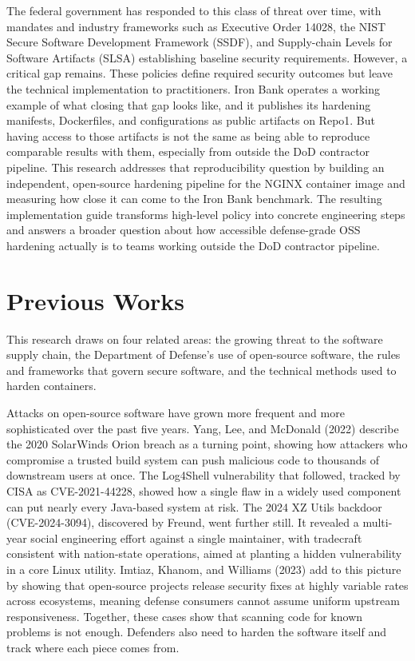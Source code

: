 \documentclass[10pt,letterpaper,twocolumn]{article}
\begin{document}
The federal government has responded to this class of threat over time, with mandates and industry frameworks such as Executive Order 14028, the NIST Secure Software Development Framework (SSDF), and Supply-chain Levels for Software Artifacts (SLSA) establishing baseline security requirements. However, a critical gap remains. These policies define required security outcomes but leave the technical implementation to practitioners. Iron Bank operates a working example of what closing that gap looks like, and it publishes its hardening manifests, Dockerfiles, and configurations as public artifacts on Repo1. But having access to those artifacts is not the same as being able to reproduce comparable results with them, especially from outside the DoD contractor pipeline. This research addresses that reproducibility question by building an independent, open-source hardening pipeline for the NGINX container image and measuring how close it can come to the Iron Bank benchmark. The resulting implementation guide transforms high-level policy into concrete engineering steps and answers a broader question about how accessible defense-grade OSS hardening actually is to teams working outside the DoD contractor pipeline.

\section{Previous Works}

This research draws on four related areas: the growing threat to the software supply chain, the Department of Defense's use of open-source software, the rules and frameworks that govern secure software, and the technical methods used to harden containers.

Attacks on open-source software have grown more frequent and more sophisticated over the past five years. Yang, Lee, and McDonald (2022) describe the 2020 SolarWinds Orion breach as a turning point, showing how attackers who compromise a trusted build system can push malicious code to thousands of downstream users at once. The Log4Shell vulnerability that followed, tracked by CISA as CVE-2021-44228, showed how a single flaw in a widely used component can put nearly every Java-based system at risk. The 2024 XZ Utils backdoor (CVE-2024-3094), discovered by Freund, went further still. It revealed a multi-year social engineering effort against a single maintainer, with tradecraft consistent with nation-state operations, aimed at planting a hidden vulnerability in a core Linux utility. Imtiaz, Khanom, and Williams (2023) add to this picture by showing that open-source projects release security fixes at highly variable rates across ecosystems, meaning defense consumers cannot assume uniform upstream responsiveness. Together, these cases show that scanning code for known problems is not enough. Defenders also need to harden the software itself and track where each piece comes from.
\end{document}

